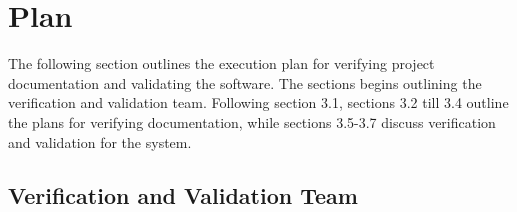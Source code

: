 \documentclass[12pt, titlepage]{article}
\begin{document}
\section{Plan}

The following section outlines the execution plan for verifying project documentation and validating the software. The sections begins outlining the verification and validation team. Following section 3.1, sections 3.2 till 3.4 outline the plans for verifying documentation, while sections 3.5-3.7 discuss verification and validation for the system.

\subsection{Verification and Validation Team}
\end{document}

